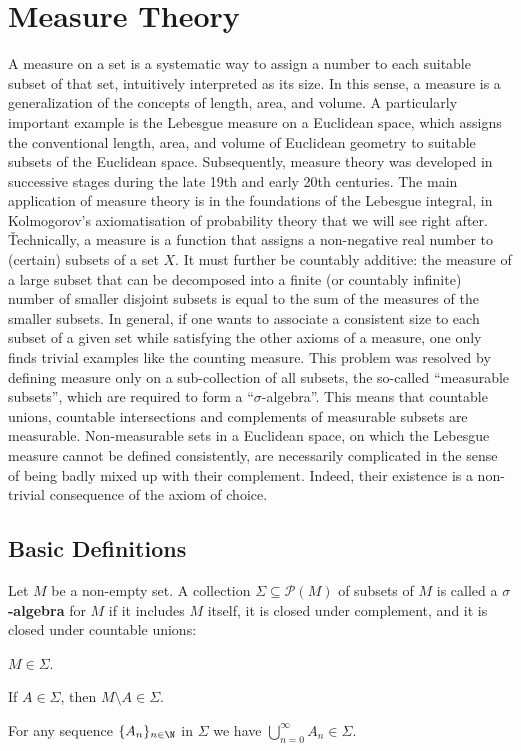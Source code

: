 \section{Measure Theory}

A measure on a set is a systematic way to assign a number to each suitable subset of that set, intuitively 
interpreted as its size. In this sense, a measure is a generalization of the concepts of length, area, and volume. 
A particularly important example is the Lebesgue measure on a Euclidean space, which assigns the conventional 
length, area, and volume of Euclidean geometry to suitable subsets of the Euclidean space. Subsequently, measure 
theory was developed in successive stages during the late 19th and early 20th centuries. The main application of 
measure theory is in the foundations of the Lebesgue integral, in Kolmogorov's axiomatisation of probability theory 
that we will see right after. \v

Technically, a measure is a function that assigns a non-negative real number to (certain) subsets of a set $X$. It
must further be countably additive: the measure of a large subset that can be decomposed into a finite (or countably
infinite) number of smaller disjoint subsets is equal to the sum of the measures of the smaller subsets. In general,
if one wants to associate a consistent size to each subset of a given set while satisfying the other axioms of a
measure, one only finds trivial examples like the counting measure. This problem was resolved by defining measure
only on a sub-collection of all subsets, the so-called ``measurable subsets'', which are required to form a
``$\sigma$-algebra''. This means that countable unions, countable intersections and complements of measurable subsets
are measurable. Non-measurable sets in a Euclidean space, on which the Lebesgue measure cannot be defined
consistently, are necessarily complicated in the sense of being badly mixed up with their complement. Indeed, their
existence is a non-trivial consequence of the axiom of choice.

\subsection{Basic Definitions}

 Let $M$ be a non-empty set. A collection $\Sigma\subseteq\mathscr{P}(M)$ of subsets of $M$ is
called a \textbf{$\sigma$-algebra} for $M$ if it includes $M$ itself, it is closed under complement, and it is closed
under countable unions:
\ben[label=(\roman*)]
\item $M\in \Sigma$.
\item If $A\in \Sigma$, then $M\setminus A \in \Sigma$.
\item For any sequence $\{A_n\}_{n\in \N}$ in $\Sigma$ we have $\bigcup_{n=0}^{\infty}A_n\in\Sigma$.
\een
\ed

